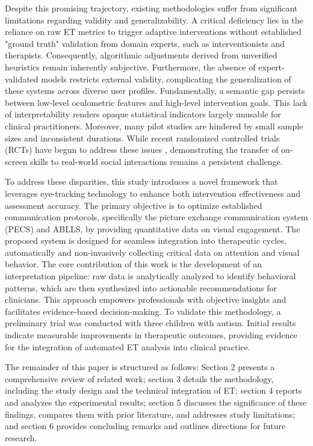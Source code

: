 Despite this promising trajectory, existing methodologies suffer from significant limitations regarding validity and generalizability. A critical deficiency lies in the reliance on raw ET metrics to trigger adaptive interventions without established "ground truth" validation from domain experts, such as interventionists and therapists. Consequently, algorithmic adjustments derived from unverified heuristics remain inherently subjective. Furthermore, the absence of expert-validated models restricts external validity, complicating the generalization of these systems across diverse user profiles. Fundamentally, a semantic gap persists between low-level oculometric features and high-level intervention goals. This lack of interpretability renders opaque statistical indicators largely unusable for clinical practitioners. Moreover, many pilot studies are hindered by small sample sizes and inconsistent durations. While recent randomized controlled trials (RCTs) have begun to address these issues \cite{ref293}, demonstrating the transfer of on-screen skills to real-world social interactions remains a persistent challenge.

To address these disparities, this study introduces a novel framework that leverages eye-tracking technology to enhance both intervention effectiveness and assessment accuracy. The primary objective is to optimize established communication protocols, specifically the picture exchange communication system (PECS) and ABLLS, by providing quantitative data on visual engagement. The proposed system is designed for seamless integration into therapeutic cycles, automatically and non-invasively collecting critical data on attention and visual behavior. The core contribution of this work is the development of an interpretation pipeline: raw data is analytically analyzed to identify behavioral patterns, which are then synthesized into actionable recommendations for clinicians. This approach empowers professionals with objective insights and facilitates evidence-based decision-making. To validate this methodology, a preliminary trial was conducted with three children with autism. Initial results indicate measurable improvements in therapeutic outcomes, providing evidence for the integration of automated ET analysis into clinical practice.

The remainder of this paper is structured as follows: Section 2 presents a comprehensive review of related work; section 3 details the methodology, including the study design and the technical integration of ET; section 4 reports and analyzes the experimental results; section 5 discusses the significance of these findings, compares them with prior literature, and addresses study limitations; and section 6 provides concluding remarks and outlines directions for future research.

